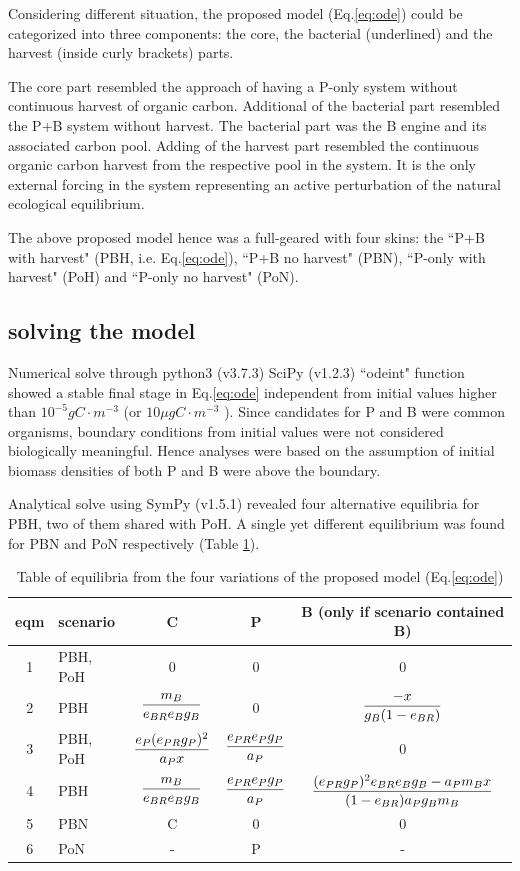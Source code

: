 \documentclass[../thesis.tex]{subfiles} %
\begin{document}
Considering different situation, the proposed model (Eq.\ref{eq:ode}) could be categorized into three components: the core, the bacterial (underlined) and the harvest (inside curly brackets) parts.

The core part resembled the approach of having a P-only system without continuous harvest of organic carbon.  Additional of the bacterial part resembled the P+B system without harvest.  The bacterial part was the B engine and its associated carbon pool.  Adding of the harvest part resembled the continuous organic carbon harvest from the respective pool in the system.  It is the only external forcing in the system representing an active perturbation of the natural ecological equilibrium.

The above proposed model hence was a full-geared with four skins: the ``P+B with harvest" (PBH, i.e. Eq.\ref{eq:ode}), ``P+B no harvest" (PBN), ``P-only with harvest" (PoH) and ``P-only no harvest" (PoN).

\subsection{solving the model}
Numerical solve through python3 (v3.7.3)\autocite{van1995python} SciPy (v1.2.3)\autocite{virtanen2020scipy} ``odeint" function showed a stable final stage in Eq.\ref{eq:ode} independent from initial values higher than $10^{-5}gC\cdot m^{-3}$ (or $10\mu gC\cdot m^{-3}$ ).  Since candidates for P and B were common organisms, boundary conditions from initial values were not considered biologically meaningful.  Hence analyses were based on the assumption of initial biomass densities of both P and B were above the boundary.

Analytical solve using SymPy (v1.5.1)\autocite{meurer2017sympy} revealed four alternative equilibria for PBH, two of them shared with PoH.  A single yet different equilibrium was found for PBN and PoN respectively (Table \ref{tab:eqm}).

\begin{table}[H]
    \centering
    \caption{Table of equilibria from the four variations of the proposed model (Eq.\ref{eq:ode})}
    \begin{tabular}{cl|ccc}\hline
        eqm & scenario & C & P & B (only if scenario contained B) \\\hline
        1 & PBH, PoH & 0 & 0 & 0 \\
        2 & PBH & $\dfrac{m_B}{e_{BR}e_Bg_B}$ & 0 & $\dfrac{-x}{g_B(1-e_{BR})}$ \\
        3 & PBH, PoH & $\dfrac{e_P(e_{PR}g_P)^2}{a_P x}$ & $\dfrac{e_{PR}e_Pg_P}{a_P}$ & 0 \\
        4 & PBH & $\dfrac{m_B}{e_{BR}e_Bg_B}$ & $\dfrac{e_{PR}e_Pg_P}{a_P}$ & $\dfrac{(e_{PR}g_P)^2e_{BR}e_Bg_B-a_Pm_B x}{(1-e_{BR})a_Pg_Bm_B}$ \\
        5 & PBN & C & 0 & 0 \\
        6 & PoN & - & P & - \\\hline
    \end{tabular}
    \label{tab:eqm}
\end{table}
\end{document}
